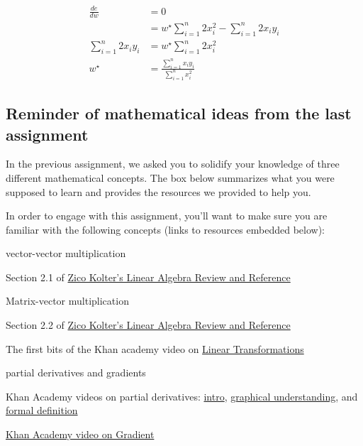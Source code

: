 \documentclass[assignment02_Solutions]{subfiles}
\begin{document}
\begin{exercise}[(10 minutes)]
\begin{boxedsolution}
\begin{align}
\frac{de}{dw} &= 0 \\
&= w^\star \sum_{i=1}^n 2 x_i^2 - \sum_{i=1}^n 2 x_i y_i \\
\sum_{i=1}^n 2 x_i y_i  &= w^\star \sum_{i=1}^n 2 x_i^2 \\
w^\star &=\frac{\sum_{i=1}^n x_i y_i}{\sum_{i=1}^n x_i^2}
\end{align}
\end{boxedsolution}

\ees


\end{exercise}

\subsection{Reminder of mathematical ideas from the last assignment}

In the previous assignment, we asked you to solidify your knowledge of three different mathematical concepts.  The box below summarizes what you were supposed to learn and provides the resources we provided to help you.

\vspace{1em}
\begin{recall}
In order to engage with this assignment, you'll want to make sure you are familiar with the following concepts (links to resources embedded below):
\bi
\item vector-vector multiplication
\bi
\item Section 2.1 of \href{https://see.stanford.edu/materials/aimlcs229/cs229-linalg.pdf}{Zico Kolter's Linear Algebra Review and Reference}
\ei
\item Matrix-vector multiplication
\bi
\item Section 2.2 of \href{https://see.stanford.edu/materials/aimlcs229/cs229-linalg.pdf}{Zico Kolter's Linear Algebra Review and Reference}
\item The first bits of the Khan academy video on \href{https://www.khanacademy.org/math/linear-algebra/matrix-transformations/linear-transformations/v/matrix-vector-products-as-linear-transformations}{Linear Transformations}
\ei
\item partial derivatives and gradients
\bi
\item Khan Academy videos on partial derivatives: \href{https://www.khanacademy.org/math/multivariable-calculus/multivariable-derivatives/partial-derivatives/v/partial-derivatives-introduction}{intro}, \href{https://www.khanacademy.org/math/multivariable-calculus/multivariable-derivatives/partial-derivatives/v/partial-derivatives-and-graphs}{graphical understanding}, and \href{https://www.khanacademy.org/math/multivariable-calculus/multivariable-derivatives/partial-derivatives/v/formal-definition-of-partial-derivatives}{formal definition}
\item \href{https://www.khanacademy.org/math/multivariable-calculus/multivariable-derivatives/gradient-and-directional-derivatives/v/gradient}{Khan Academy video on Gradient}
\ei
\ei
\end{recall}
\end{document}
